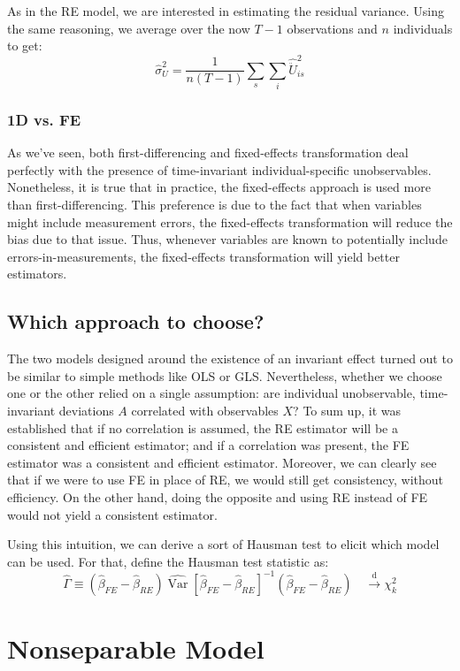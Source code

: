 \documentclass[12pt]{report}
\newcommand{\dconv}{\overset{\text{d}}{\to}}
\begin{document}
As in the RE model, we are interested in estimating the residual variance. Using the same reasoning, we average over the now $T-1$ observations and $n$ individuals to get: $$\hat\sigma_U^2 = \frac{1}{n(T-1)}\sum_s \sum_i \hat{\ddot{U}}_{is}^2 $$

\subsubsection{1D vs. FE}

As we've seen, both first-differencing and fixed-effects transformation deal perfectly with the presence of time-invariant individual-specific unobservables. Nonetheless, it is true that in practice, the fixed-effects approach is used more than first-differencing. This preference is due to the fact that when variables might include measurement errors, the fixed-effects transformation will reduce the bias due to that issue. Thus, whenever variables are known to potentially include errors-in-measurements, the fixed-effects transformation will yield better estimators.

\subsection{Which approach to choose?}

The two models designed around the existence of an invariant effect turned out to be similar to simple methods like OLS or GLS. Nevertheless, whether we choose one or the other relied on a single assumption: are individual unobservable, time-invariant deviations $A$ correlated with observables $X$? To sum up, it was established that if no correlation is assumed, the RE estimator will be a consistent and efficient estimator; and if a correlation was present, the FE estimator was a consistent and efficient estimator. Moreover, we can clearly see that if we were to use FE in place of RE, we would still get consistency, without efficiency. On the other hand, doing the opposite and using RE instead of FE would not yield a consistent estimator.

Using this intuition, we can derive a sort of Hausman test to elicit which model can be used. For that, define the Hausman test statistic as: $$\hat\Gamma \equiv \left(\hat\beta_{FE} - \hat\beta_{RE}\right)\widehat{\operatorname{Var}}\left[\hat\beta_{FE} - \hat\beta_{RE}\right]^{-1}\left(\hat\beta_{FE} - \hat\beta_{RE}\right)  \quad \dconv \chi_k^2 $$

\section{Nonseparable Model}
\end{document}
